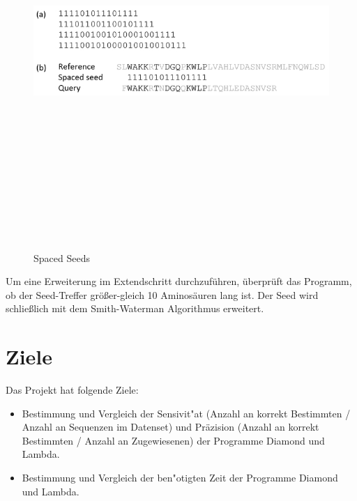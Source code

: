 \documentclass[10pt, a4paper]{report}[08.12.2015]
\begin{document}
\begin{figure}[h]
\centering
      \noindent\includegraphics[width=\linewidth,height=15cm,
      keepaspectratio]{Abbildungen/diamond_spacedSeeds.jpg}
      \caption{Spaced Seeds}
      \label{fig:diamond}
\end{figure}
\newline
    Um eine Erweiterung im Extendschritt durchzuf\"uhren, \"uberpr\"uft das Programm, ob der Seed-Treffer gr\"o{\ss}er-gleich 10 Aminos\"auren lang ist. Der Seed wird schlie{\ss}lich mit dem Smith-Waterman Algorithmus erweitert.
\newline
    
    
 
    \section{Ziele}
    
    Das Projekt hat folgende Ziele:
    
    \begin{itemize}
    
      \item Bestimmung und Vergleich der Sensivit"at (Anzahl an korrekt Bestimmten / Anzahl an Sequenzen im Datenset) und Pr\"azision (Anzahl an korrekt Bestimmten / Anzahl an Zugewiesenen) der Programme \textrm{Diamond} 				und \textrm{Lambda}.
      
      \item Bestimmung und Vergleich der ben"otigten Zeit der Programme
      		\textrm{Diamond} und \textrm{Lambda}.

      
    
    \end{itemize}
\end{document}
